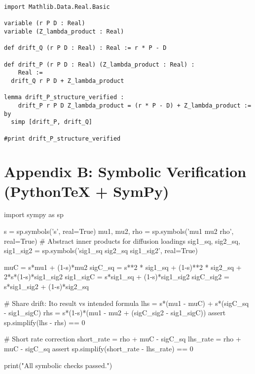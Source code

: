 ﻿\documentclass[11pt,letterpaper,oneside]{article}
\numberwithin{equation}{section}
\newcommand{\1}{\mathbf{1}}
\begin{document}
\begin{leanproof}[title={Algebraic Structure of Girsanov Drift Adjustment (Prop.~\ref{prop:fbsde})}]
\begin{lstlisting}[basicstyle=\ttfamily\small]
import Mathlib.Data.Real.Basic

variable (r P D : Real)
variable (Z_lambda_product : Real)

def drift_Q (r P D : Real) : Real := r * P - D

def drift_P (r P D : Real) (Z_lambda_product : Real) :
    Real :=
  drift_Q r P D + Z_lambda_product

lemma drift_P_structure_verified :
    drift_P r P D Z_lambda_product = (r * P - D) + Z_lambda_product := by
  simp [drift_P, drift_Q]

#print drift_P_structure_verified
\end{lstlisting}
\end{leanproof}

\section{Appendix B: Symbolic Verification (PythonTeX + SymPy)}\label{app:sympy}
\begin{sympycheck}
\begin{pyconsole}
import sympy as sp

s = sp.symbols('s', real=True)
mu1, mu2, rho = sp.symbols('mu1 mu2 rho', real=True)
# Abstract inner products for diffusion loadings
sig1_sq, sig2_sq, sig1_sig2 = sp.symbols('sig1_sq sig2_sq sig1_sig2', real=True)

muC = s*mu1 + (1-s)*mu2
sigC_sq = s**2 * sig1_sq + (1-s)**2 * sig2_sq + 2*s*(1-s)*sig1_sig2
sig1_sigC = s*sig1_sq + (1-s)*sig1_sig2
sigC_sig2 = s*sig1_sig2 + (1-s)*sig2_sq

# Share drift: Ito result vs intended formula
lhs = s*(mu1 - muC) + s*(sigC_sq - sig1_sigC)
rhs = s*(1-s)*(mu1 - mu2 + (sigC_sig2 - sig1_sigC))
assert sp.simplify(lhs - rhs) == 0

# Short rate correction
short_rate = rho + muC - sigC_sq
lhs_rate = rho + muC - sigC_sq
assert sp.simplify(short_rate - lhs_rate) == 0

print("All symbolic checks passed.")
\end{pyconsole}
\end{sympycheck}
\end{document}
